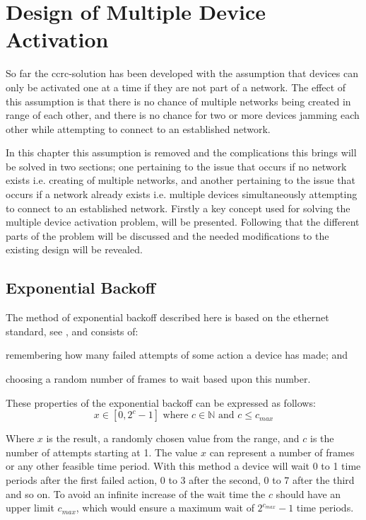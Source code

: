 \chapter{Design of Multiple Device Activation}\label{chap:MDA-CCRC}
So far the \gls{ccrc}-solution has been developed with the assumption that devices can only be activated one at a time if they are not part of a network.
The effect of this assumption is that there is no chance of multiple networks being created in range of each other, and there is no chance for two or more devices jamming each other while attempting to connect to an established network.

In this chapter this assumption is removed and the complications this brings will be solved in two sections; one pertaining to the issue that occurs if no network exists i.e. creating of multiple networks, and another pertaining to the issue that occurs if a network already exists i.e. multiple devices simultaneously attempting to connect to an established network.
Firstly a key concept used for solving the multiple device activation problem, will be presented.
Following that the different parts of the problem will be discussed and the needed modifications to the existing design will be revealed.

\section{Exponential Backoff} %
\label{sec:exponential_backoff}
The method of exponential backoff described here is based on the ethernet standard, see \citep{Ebackoff}, and consists of:
\begin{enumerate*}[label=\itshape \alph*\upshape)]
    \item remembering how many failed attempts of some action a device has made; and
    \item choosing a random number of frames to wait based upon this number.   
\end{enumerate*}
These properties of the exponential backoff can be expressed as follows:
\begin{equation}
     x \in [0, 2^c - 1] \text{ where } c \in \mathbb{N} \text{ and } {c \leq c_{max}}
\end{equation}

\noindent
Where $x$ is the result, a randomly chosen value from the range, and $c$ is the number of attempts starting at 1. 
The value $x$ can represent a number of frames or any other feasible time period.
With this method a device will wait 0 to 1 time periods after the first failed action, 0 to 3 after the second, 0 to 7 after the third and so on. 
To avoid an infinite increase of the wait time the $c$ should have an upper limit $c_{max}$, which would ensure a maximum wait of $2^{c_{max}}-1$ time periods.

